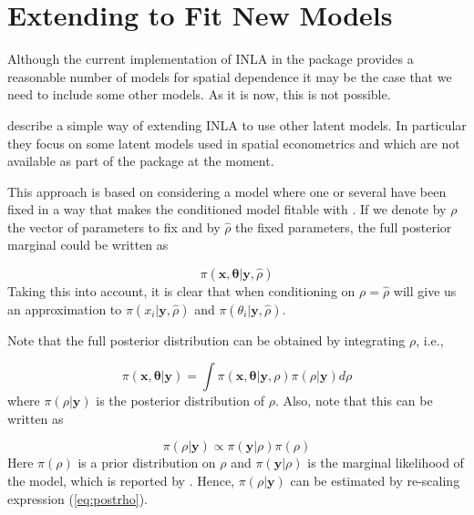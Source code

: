 \documentclass[article]{jss}
\begin{document}
\section[Extending R-INLA to Fit New Models]{Extending  to Fit New
Models} 

\label{sec:extINLA}


Although the current implementation of INLA in the  package
provides a reasonable number of models for spatial dependence it may be the
case that we need to include some other models. As it is now, this is not
possible.

\citet{Bivandetal:2013} describe a simple way of extending INLA to use other
latent models.  In particular they focus on some latent models used in spatial
econometrics and which are not available as part of the  package at
the moment.

This approach is based on considering a model where one or several have been
fixed in a way that makes the conditioned model fitable with .  If
we denote by $\rho$ the vector of parameters to fix and by $\hat{\rho}$ the
fixed parameters,  the full posterior marginal could be written as


$$
\pi(\mathbf{x}, \mathbf{\theta}|\mathbf{y}, \hat{\rho}) 
$$
\noindent
Taking this into account,  it is clear that when conditioning on
$\rho=\hat\rho$  will give us an approximation to
$\pi(x_i|\mathbf{y}, \hat{\rho})$ and $\pi(\theta_i|\mathbf{y}, \hat{\rho})$.



Note that the full posterior distribution can be obtained by integrating $\rho$,
i.e.,

\begin{equation}
\pi(\mathbf{x}, \mathbf{\theta}|\mathbf{y}) = 
\int \pi(\mathbf{x}, \mathbf{\theta}|\mathbf{y}, \rho)\pi(\rho|\mathbf{y})d\rho
\label{eq:fullpost}
\end{equation}
\noindent
where $\pi(\rho|\mathbf{y})$ is the posterior distribution of $\rho$. Also,
note that this can be written as

\begin{equation}
\pi(\rho|\mathbf{y}) \propto \pi(\mathbf{y}|\rho) \pi(\rho)
\label{eq:postrho}
\end{equation}
\noindent
Here $\pi(\rho)$ is a prior distribution on $\rho$ and $\pi(\mathbf{y}|\rho)$
is the marginal likelihood of the model, which is reported by .
Hence, $\pi(\rho|\mathbf{y})$ can be estimated by re-scaling expression 
(\ref{eq:postrho}).
\end{document}
